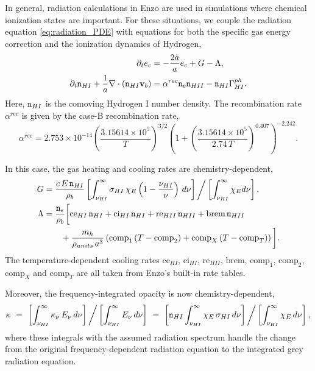 \documentclass[letterpaper,10pt]{article}
\renewcommand{\(}{\left(}
\renewcommand{\)}{\right)}
\newcommand{\vb}{{\bf v}_b}
\newcommand{\rhob}{\rho_b}
\newcommand{\mn}{{\tt n}}
\begin{document}
In general, radiation calculations in Enzo are used in simulations
where chemical ionization states are important.  For these situations, 
we couple the radiation equation \eqref{eq:radiation_PDE} with
equations for both the specific gas energy correction and the
ionization dynamics of Hydrogen,
\begin{align}
  \notag
  \partial_t e_c &= -\frac{2\dot{a}}{a}e_c + G - \Lambda, \\
  \label{eq:hydrogen_ionization}
  \partial_t \mn_{HI} + \frac{1}{a}\nabla\cdot\(\mn_{HI}\vb\) &=
    \alpha^{rec} \mn_e \mn_{HII} - \mn_{HI} \Gamma_{HI}^{ph}. 
\end{align}
Here, $\mn_{HI}$ is the comoving Hydrogen I number density.  The
recombination rate $\alpha^{rec}$ is given by the case-B
recombination rate, 
\begin{equation}
\label{eq:alphaB}
\alpha^{rec} = 2.753\times 10^{-14} \left(\frac{3.15614\times 10^5}{T}\right)^{3/2} 
                   \left(1+\left(\frac{3.15614\times 10^5}{2.74\, T}\right)^{0.407}\right)^{-2.242}.
\end{equation}

In this case, the gas heating and cooling rates are
chemistry-dependent, 
\begin{align}
  \label{eq:G_nLTE}
  G &= \frac{c\,E\,\mn_{HI}}{\rhob} 
    \left[\int_{\nu_{HI}}^{\infty} \sigma_{HI}\, \chi_E
    \left(1-\frac{\nu_{HI}}{\nu}\right)\, d\nu\right] \bigg/
    \left[\int_{\nu_{HI}}^{\infty} \chi_E d\nu\right], \\
\label{eq:Lambda_nLTE}
  \Lambda &= \frac{\mn_e}{\rhob}\bigg[\text{ce}_{HI}\, \mn_{HI} 
  + \text{ci}_{HI}\, \mn_{HI} + \text{re}_{HII}\, \mn_{HII} + \text{brem}\,
  \mn_{HII} \\
  \notag &\qquad+ \frac{m_h}{\rho_{units}\, a^3} \left(\text{comp}_1\, (T-\text{comp}_2) 
    + \text{comp}_{X}\, (T-\text{comp}_{T})\right) \bigg].
\end{align}
The temperature-dependent cooling rates
$\text{ce}_{HI}$, $\text{ci}_{HI}$, $\text{re}_{HII}$, $\text{brem}$,
$\text{comp}_1$, $\text{comp}_2$, $\text{comp}_{X}$ and
$\text{comp}_{T}$ are all taken from Enzo's built-in rate tables.

Moreover, the frequency-integrated opacity is now chemistry-dependent,
\begin{equation}
\label{eq:opacityHI}
  \kappa \ = \ 
  \left[\int_{\nu_{HI}}^{\infty} \kappa_{\nu}\,E_{\nu}\,d\nu\right] \bigg/
  \left[\int_{\nu_{HI}}^{\infty} E_{\nu}\,d\nu\right] \ = \ 
  \left[\mn_{HI} \int_{\nu_{HI}}^{\infty}
    \chi_E\,\sigma_{HI}\,d\nu\right] \bigg/
  \left[\int_{\nu_{HI}}^{\infty} \chi_E\,d\nu\right],
\end{equation}
where these integrals with the assumed radiation spectrum handle the
change from the original frequency-dependent radiation equation to the
integrated grey radiation equation.
\end{document}
